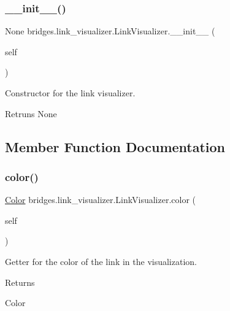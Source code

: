 \subsubsection{\texorpdfstring{\_\_init\_\_()}{\_\_init\_\_()}}
{\footnotesize\ttfamily  None bridges.\+link\+\_\+visualizer.\+Link\+Visualizer.\+\_\+\+\_\+init\+\_\+\+\_\+ (\begin{DoxyParamCaption}\item[{}]{self }\end{DoxyParamCaption})}



Constructor for the link visualizer\textquotesingle{}. 

\begin{DoxyParagraph}{Retruns}
None 
\end{DoxyParagraph}


\subsection{Member Function Documentation}
\mbox{\label{classbridges_1_1link__visualizer_1_1_link_visualizer_a5b25e6b17996c74d84f0ca523564a6cc}} 
\subsubsection{\texorpdfstring{color()}{color()}\hspace{0.1cm}{\footnotesize\ttfamily [1/2]}}
{\footnotesize\ttfamily  \mbox{\hyperlink{classbridges_1_1color_1_1_color}{Color}} bridges.\+link\+\_\+visualizer.\+Link\+Visualizer.\+color (\begin{DoxyParamCaption}\item[{}]{self }\end{DoxyParamCaption})}



Getter for the color of the link in the visualization. 

\begin{DoxyReturn}{Returns}


Color 
\end{DoxyReturn}
\mbox{\label{classbridges_1_1link__visualizer_1_1_link_visualizer_a5c0e2cc1b9c26bbc801f6e46b9b71ef0}} 
